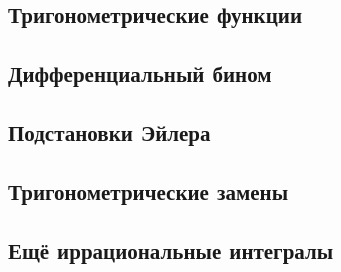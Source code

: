 \documentclass[main]{subfiles}
\begin{document}
    \subsection{Тригонометрические функции}

    \subsection{Дифференциальный бином}

    \subsection{Подстановки Эйлера}

    \subsection{Тригонометрические замены}

    \subsection{Ещё иррациональные интегралы}
\end{document}
